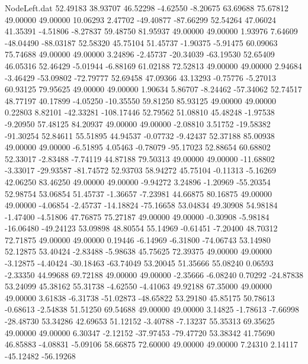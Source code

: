 \begin{filecontents}{NodeLeft.dat}
  52.49183   38.93707   46.52298    -4.62550   -8.20675   63.69688   75.67812   49.00000   49.00000   10.06293    2.47702  -49.40877  -87.66299
  52.54264   47.06024   41.35391    -4.51806   -8.27837   59.48750   81.95937   49.00000   49.00000    1.93976    7.64609  -48.04490  -88.03187
  52.58320   45.75104   51.45737    -1.90375   -5.91475   60.09063   75.74688   49.00000   49.00000    3.24896   -2.45737  -20.34039  -63.19530
  52.65409   46.05316   52.46429    -5.01944   -6.88169   61.02188   72.52813   49.00000   49.00000    2.94684   -3.46429  -53.09802  -72.79777
  52.69458   47.09366   43.13293    -0.75776   -5.27013   60.93125   79.95625   49.00000   49.00000    1.90634    5.86707   -8.24462  -57.34062
  52.74517   48.77197   40.17899    -4.05250  -10.35550   59.81250   85.93125   49.00000   49.00000    0.22803    8.82101  -42.33281 -108.17446
  52.79562   51.08810   45.48248    -1.97538   -9.20950   57.48125   84.20937   49.00000   49.00000   -2.08810    3.51752  -19.58382  -91.30254
  52.84611   55.51895   44.94537    -0.07732   -9.42437   52.37188   85.00938   49.00000   49.00000   -6.51895    4.05463   -0.78079  -95.17023
  52.88654   60.68802   52.33017    -2.83488   -7.74119   44.87188   79.50313   49.00000   49.00000  -11.68802   -3.33017  -29.93587  -81.74572
  52.93703   58.94272   45.75104    -0.11313   -5.16269   42.06250   83.46250   49.00000   49.00000   -9.94272    3.24896   -1.20969  -55.20354
  52.98754   53.06854   51.45737    -1.36657   -7.23981   44.66875   80.16875   49.00000   49.00000   -4.06854   -2.45737  -14.18824  -75.16658
  53.04834   49.30908   54.98184    -1.47400   -4.51806   47.76875   75.27187   49.00000   49.00000   -0.30908   -5.98184  -16.06480  -49.24123
  53.09898   48.80554   55.14969    -0.61451   -7.20400   48.70312   72.71875   49.00000   49.00000    0.19446   -6.14969   -6.31800  -74.06743
  53.14980   52.12875   53.40424    -2.83488   -5.98638   45.75625   72.39375   49.00000   49.00000   -3.12875   -4.40424  -30.18463  -63.74049
  53.20045   51.35666   55.08240     0.06593   -2.33350   44.99688   69.72188   49.00000   49.00000   -2.35666   -6.08240    0.70292  -24.87838
  53.24099   45.38162   55.31738    -4.62550   -4.41063   49.92188   67.35000   49.00000   49.00000    3.61838   -6.31738  -51.02873  -48.65822
  53.29180   45.85175   50.78613    -0.68613   -2.54838   51.51250   69.54688   49.00000   49.00000    3.14825   -1.78613   -7.66998  -28.48730
  53.34286   42.69653   51.12152    -3.40788   -7.13237   55.35313   69.35625   49.00000   49.00000    6.30347   -2.12152  -37.97453  -79.47720
  53.38342   41.75690   46.85883    -4.08831   -5.09106   58.66875   72.60000   49.00000   49.00000    7.24310    2.14117  -45.12482  -56.19268

\end{filecontents}
